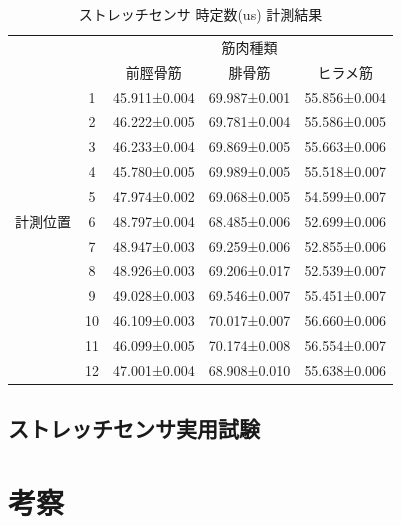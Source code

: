 \begin{table}[h]
    \caption{ストレッチセンサ 時定数(us) 計測結果}
    \label{4_2}
        \begin{center}
            \begin{tabular}{|c|c|ccc|}\hline
            \multicolumn{2}{|c|}{} & \multicolumn{3}{c|}{筋肉種類}\\
            \cline{3-5}
            \multicolumn{2}{|c|}{} & 前脛骨筋 & 腓骨筋 & ヒラメ筋 \\ \hline
            & 1 & 45.911±0.004 & 69.987±0.001 & 55.856±0.004 \\ \cline{2-5}
            & 2 & 46.222±0.005 & 69.781±0.004 & 55.586±0.005 \\ \cline{2-5}
            & 3 & 46.233±0.004 & 69.869±0.005 & 55.663±0.006 \\ \cline{2-5}
            & 4 & 45.780±0.005 & 69.989±0.005 & 55.518±0.007 \\ \cline{2-5}
            & 5 & 47.974±0.002 & 69.068±0.005 & 54.599±0.007 \\ \cline{2-5}
            計測位置 & 6 & 48.797±0.004 & 68.485±0.006 & 52.699±0.006 \\ \cline{2-5}
            & 7 & 48.947±0.003 & 69.259±0.006 & 52.855±0.006 \\ \cline{2-5}
            & 8 & 48.926±0.003 & 69.206±0.017 & 52.539±0.007 \\ \cline{2-5}
            & 9 & 49.028±0.003 & 69.546±0.007 & 55.451±0.007 \\ \cline{2-5}
            & 10 & 46.109±0.003 & 70.017±0.007 & 56.660±0.006 \\ \cline{2-5}
            & 11 & 46.099±0.005 & 70.174±0.008 & 56.554±0.007 \\ \cline{2-5}
            & 12 & 47.001±0.004 & 68.908±0.010 & 55.638±0.006 \\ \hline
        \end{tabular}
    \end{center}
\end{table}

\subsection{ストレッチセンサ実用試験}

\section{考察}
